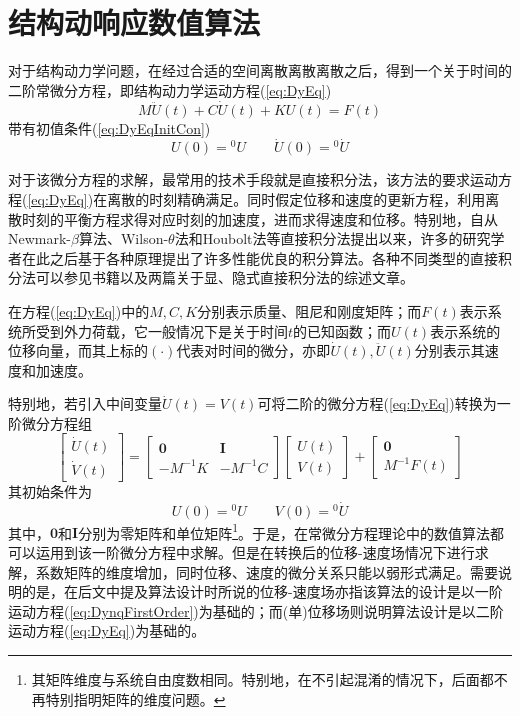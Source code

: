 \chapter{结构动响应数值算法}
对于结构动力学问题，在经过合适的空间离散离散离散之后，得到一个关于时间的二阶常微分方程，即结构动力学运动方程(\ref{eq:DyEq})
\begin{equation}
	M\ddot{U}(t)+C\dot{U}(t)+KU(t)=F(t)\label{eq:DyEq}
\end{equation}
带有初值条件(\ref{eq:DyEqInitCon})
\begin{equation}
{U}(0)={^0\!U}\qquad \dot{U}(0)={^0\!\dot{U}}\label{eq:DyEqInitCon}
\end{equation}

对于该微分方程的求解，最常用的技术手段就是直接积分法，该方法的要求运动方程(\ref{eq:DyEq})在离散的时刻精确满足。同时假定位移和速度的更新方程，利用离散时刻的平衡方程求得对应时刻的加速度，进而求得速度和位移。特别地，自从Newmark-$\beta$算法\cite{Newmark1959}、Wilson-$\theta$法\cite{Wilson1968}和Houbolt法\cite{Chopra2011}等直接积分法提出以来，许多的研究学者在此之后基于各种原理提出了许多性能优良的积分算法。各种不同类型的直接积分法可以参见书籍\cite{Wood,book:dover,Zienkiewicz1991a,Hairer1993,ErnstHairer1996}以及两篇关于显、隐式直接积分法的综述文章\cite{Dokainish1989,Subbaraj1989}。

在方程(\ref{eq:DyEq})中的$M,C,K$分别表示质量、阻尼和刚度矩阵；而$F(t)$表示系统所受到外力荷载，它一般情况下是关于时间$t$的已知函数；而$U(t)$表示系统的位移向量，而其上标的$(\cdot{})$代表对时间的微分，亦即$\dot{U}(t),\ddot{U}(t)$分别表示其速度和加速度。

特别地，若引入中间变量$\dot{U}(t)=V(t)$可将二阶的微分方程(\ref{eq:DyEq})转换为一阶微分方程组
\begin{equation}
\begin{bmatrix}
\dot{U}(t)\\
\dot{V}(t)
\end{bmatrix}=\begin{bmatrix}
\mathbf{0}&\mathbf{I}\\
-M^{-1}K&-M^{-1}C
\end{bmatrix}\begin{bmatrix}
{U}(t)\\
{V}(t)
\end{bmatrix}+\begin{bmatrix}
\mathbf{0}\\
M^{-1}F(t)
\end{bmatrix}\label{eq:DynqFirstOrder}
\end{equation}
其初始条件为
\begin{equation}
{U}(0)={^0\!U}\qquad V(0)={^0\!\dot{U}}
\end{equation}
其中，$\mathbf{0}$和$\mathbf{I}$分别为零矩阵和单位矩阵\footnote{其矩阵维度与系统自由度数相同。特别地，在不引起混淆的情况下，后面都不再特别指明矩阵的维度问题。}。于是，在常微分方程理论中的数值算法都可以运用到该一阶微分方程中求解。但是在转换后的位移-速度场情况下进行求解，系数矩阵的维度增加，同时位移、速度的微分关系只能以弱形式满足。需要说明的是，在后文中提及算法设计时所说的位移-速度场亦指该算法的设计是以一阶运动方程(\ref{eq:DynqFirstOrder})为基础的；而(单)位移场则说明算法设计是以二阶运动方程(\ref{eq:DyEq})为基础的。

